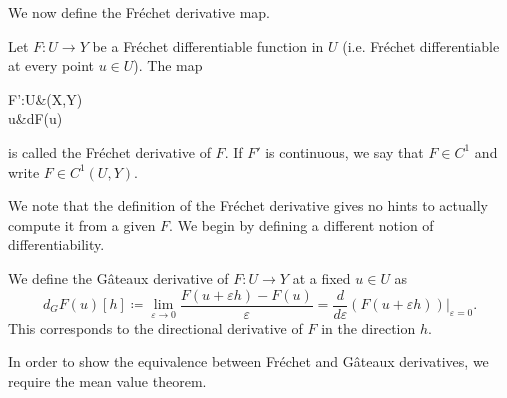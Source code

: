 We now define the Fréchet derivative map.
\begin{definition}
    Let $F:U\to Y$ be a Fréchet differentiable function in $U$ (i.e. Fréchet differentiable at every point $u\in U$). The map
    \begin{tightalign*}
            F':U&\to {}(X,Y)\\
            u&\mapsto dF(u)
    \end{tightalign*}
    is called the Fréchet derivative of $F$. If $F'$ is continuous, we say that $F\in C^1$ and write $F\in C^1(U,Y)$.
\end{definition}

We note that the definition of the Fréchet derivative gives no hints to actually compute it from a given $F$. We begin by defining a different notion of differentiability.
\begin{definition}
    We define the Gâteaux derivative of $F:U\to Y$ at a fixed $u\in U$ as
    \begin{equation*}
        d_G F(u)[h] \coloneqq \lim_{\varepsilon\to 0} \frac{F(u+\varepsilon h)-F(u)}{\varepsilon} = \frac{d}{d\varepsilon}\left.\left(F(u+\varepsilon h)\right)\right|_{\varepsilon = 0}.
    \end{equation*}
    This corresponds to the directional derivative of $F$ in the direction $h$.
\end{definition}
In order to show the equivalence between Fréchet and Gâteaux derivatives, we require the mean value theorem. 

